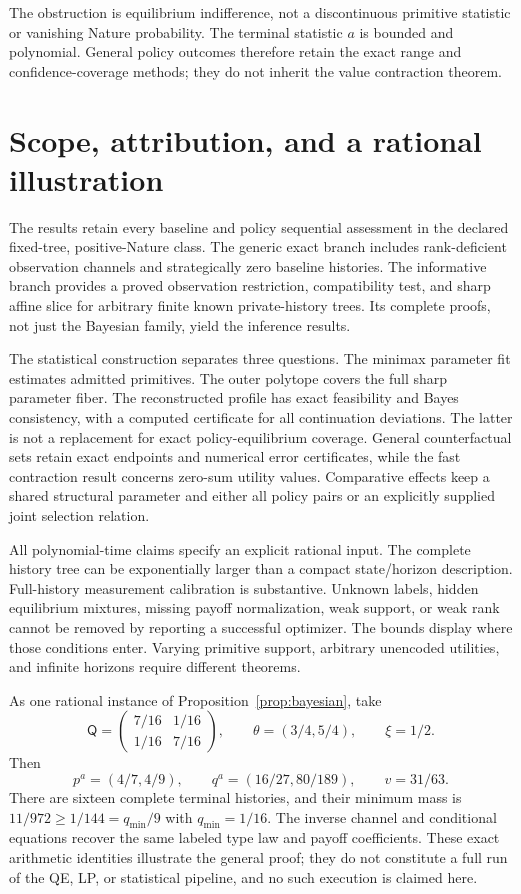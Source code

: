 \documentclass[11pt,a4paper]{article}
\numberwithin{equation}{section}
\theoremstyle{definition}
\begin{document}
The obstruction is equilibrium indifference, not a discontinuous
primitive statistic or vanishing Nature probability. The terminal
statistic \(a\) is bounded and polynomial. General policy outcomes
therefore retain the exact range and confidence-coverage methods;
they do not inherit the value contraction theorem.

\section{Scope, attribution, and a rational illustration}
\label{sec:conclusion}
The results retain every baseline and policy sequential assessment
in the declared fixed-tree, positive-Nature class.
The generic exact branch includes rank-deficient observation channels
and strategically zero baseline histories.
The informative branch provides a proved observation restriction,
compatibility test, and sharp affine slice for arbitrary finite known
private-history trees. Its complete proofs, not just the Bayesian
family, yield the inference results.

The statistical construction separates three questions.
The minimax parameter fit estimates admitted primitives.
The outer polytope covers the full sharp parameter fiber.
The reconstructed profile has exact feasibility and Bayes consistency,
with a computed certificate for all continuation deviations.
The latter is not a replacement for exact policy-equilibrium coverage.
General counterfactual sets retain exact endpoints and numerical
error certificates, while the fast contraction result concerns
zero-sum utility values. Comparative effects keep a shared structural
parameter and either all policy pairs or an explicitly supplied
joint selection relation.

All polynomial-time claims specify an explicit rational input.
The complete history tree can be exponentially larger than a compact
state/horizon description. Full-history measurement calibration is
substantive. Unknown labels, hidden equilibrium mixtures, missing
payoff normalization, weak support, or weak rank cannot be removed by
reporting a successful optimizer. The bounds display where those
conditions enter. Varying primitive support, arbitrary unencoded
utilities, and infinite horizons require different theorems.

As one rational instance of Proposition~\ref{prop:bayesian}, take
\[
 \mathsf Q=
   \begin{pmatrix}7/16&1/16\\1/16&7/16\end{pmatrix},\qquad
 \theta=(3/4,5/4),\qquad \xi=1/2.
\]
Then
\[
 p^a=(4/7,4/9),\qquad q^a=(16/27,80/189),\qquad
 v=31/63 .
\]
There are sixteen complete terminal histories, and their minimum
mass is \(11/972\ge1/144=q_{\min}/9\) with \(q_{\min}=1/16\).
The inverse channel and conditional equations recover the same
labeled type law and payoff coefficients.
These exact arithmetic identities illustrate the general proof;
they do not constitute a full run of the QE, LP, or statistical
pipeline, and no such execution is claimed here.
\end{document}
